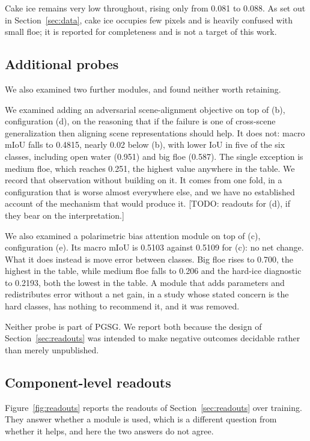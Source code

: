 \documentclass[preprint,12pt,authoryear]{elsarticle}
\begin{document}
Cake ice remains very low throughout, rising only from 0.081 to 0.088. As set
out in Section~\ref{sec:data}, cake ice occupies few pixels and is heavily
confused with small floe; it is reported for completeness and is not a target of
this work.

\subsection{Additional probes}

We also examined two further modules, and found neither worth retaining.

We examined adding an adversarial scene-alignment objective on top of (b),
configuration (d), on the reasoning that if the failure is one of cross-scene
generalization then aligning scene representations should help. It does not:
macro mIoU falls to 0.4815, nearly 0.02 below (b), with lower IoU in five of the
six classes, including open water (0.951) and big floe (0.587). The single
exception is medium floe, which reaches 0.251, the highest value anywhere in
the table. We record that observation without building on it. It comes from one
fold, in a configuration that is worse almost everywhere else, and we have no
established account of the mechanism that would produce it.
[TODO: readouts for (d), if they bear on the interpretation.]

We also examined a polarimetric bias attention module on top of (c),
configuration (e). Its macro mIoU is 0.5103 against 0.5109 for (c): no net
change. What it does instead is move error between classes. Big floe rises to
0.700, the highest in the table, while medium floe falls to 0.206 and the
hard-ice diagnostic to 0.2193, both the lowest in the table. A module that adds
parameters and redistributes error without a net gain, in a study whose stated
concern is the hard classes, has nothing to recommend it, and it was removed.

Neither probe is part of PGSG. We report both because the design of
Section~\ref{sec:readouts} was intended to make negative outcomes decidable
rather than merely unpublished.

\subsection{Component-level readouts}

Figure~\ref{fig:readouts} reports the readouts of Section~\ref{sec:readouts}
over training. They answer whether a module is used, which is a different
question from whether it helps, and here the two answers do not agree.
\end{document}
